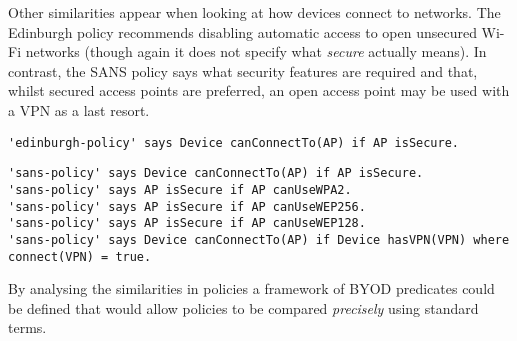 \documentclass{easychair}
\begin{document}
Other similarities appear when looking at how devices connect to networks.
The Edinburgh policy recommends disabling automatic access to open unsecured Wi-Fi networks (though again it does not specify what \emph{secure} actually means). 
In contrast, the SANS policy says what security features are required and that, whilst secured access points are preferred, an open access point may be used with a VPN as a last resort.
\begin{lstlisting}[title={\footnotesize\textbf{Edinburgh}:~\itshape ``Control your devices connections by disabling automatic connection to open, unsecured Wi-Fi networks.''}]
'edinburgh-policy' says Device canConnectTo(AP) if AP isSecure.
\end{lstlisting}
\begin{lstlisting}[title={\footnotesize\textbf{SANS}:~\itshape ``If mobile workers do require connectivity through public, open, or untrusted WLAN, then users MUST use WLANs using, if available and in this order: WPA(2) encryption, WEP 256 bits (or 128 bits), or finally open networks if nothing else is available. Users connected to data networks in an open environment MUST use a VPN connection.''}]
'sans-policy' says Device canConnectTo(AP) if AP isSecure.
'sans-policy' says AP isSecure if AP canUseWPA2.
'sans-policy' says AP isSecure if AP canUseWEP256.
'sans-policy' says AP isSecure if AP canUseWEP128.
'sans-policy' says Device canConnectTo(AP) if Device hasVPN(VPN) where connect(VPN) = true.
\end{lstlisting}
By analysing the similarities in policies a framework of BYOD predicates could be defined that would allow policies to be compared \emph{precisely} using standard terms.
\end{document}
